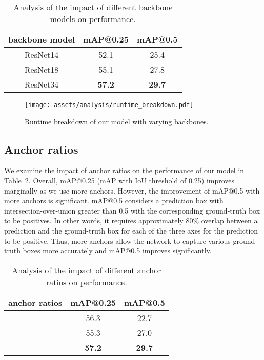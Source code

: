 \documentclass[runningheads]{llncs}
\begin{document}
\begin{table}[]
    \centering
    \begin{tabular}{c||cc}
    \toprule
    backbone model & mAP@0.25 & mAP@0.5 \\ \midrule
    ResNet14 & 52.1 &  25.4  \\
    ResNet18 & 55.1 &  27.8 \\ \midrule
    ResNet34 & \textbf{57.2}  & \textbf{29.7}   \\ \bottomrule
    \end{tabular}
    \vspace{1em}
    \caption{Analysis of the impact of different backbone models on performance.}
    \label{tab:backbone}
\end{table}

\begin{figure}
    \centering
    \texttt{[image: assets/analysis/runtime\_breakdown.pdf]}
    \caption{Runtime breakdown of our model with varying backbones.}
    \label{fig:runtime_breakdown}
\end{figure}

\subsection{Anchor ratios}

We examine the impact of anchor ratios on the performance of our model in Table~\ref{tab:anchor_ratios}. Overall, mAP@0.25 (mAP with IoU threshold of 0.25) improves marginally as we use more anchors. However, the improvement of mAP@0.5 with more anchors is significant. mAP@0.5 considers a prediction box with intersection-over-union greater than 0.5 with the corresponding ground-truth box to be positives. In other words, it requires approximately 80\% overlap between a prediction and the ground-truth box for each of the three axes for the prediction to be positive. Thus, more anchors allow the network to capture various ground truth boxes more accurately and mAP@0.5 improves significantly.

\begin{table}[]
    \centering
    \begin{tabular}{c||cc}
    \toprule
    anchor ratios & mAP@0.25 & mAP@0.5  \\ \midrule
     & 56.3 &  22.7   \\
     & 55.3 &  27.0  \\ \midrule
     & \textbf{57.2}  & \textbf{29.7}  \\ \bottomrule
    \end{tabular}
    \vspace{1em}
    \caption{Analysis of the impact of different anchor ratios on performance.}
    \label{tab:anchor_ratios}
\end{table}
\end{document}
